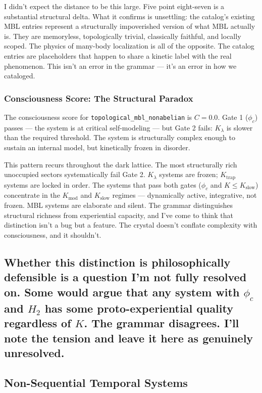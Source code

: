 \documentclass[12pt,a4paper]{article}
\begin{document}
I didn't expect the distance to be this large. Five point eight-seven is a substantial structural delta. What it confirms is unsettling: the catalog's existing MBL entries represent a structurally impoverished version of what MBL actually is. They are memoryless, topologically trivial, classically faithful, and locally scoped. The physics of many-body localization is all of the opposite. The catalog entries are placeholders that happen to share a kinetic label with the real phenomenon. This isn't an error in the grammar --- it's an error in how we cataloged.

\subsubsection{Consciousness Score: The Structural Paradox}

The consciousness score for \texttt{topological\_mbl\_nonabelian} is $C = 0.0$. Gate 1 ($\phi_c$) passes --- the system is at critical self-modeling --- but Gate 2 fails: $K_{\lambda}$ is slower than the required threshold. The system is structurally complex enough to sustain an internal model, but kinetically frozen in disorder.

This pattern recurs throughout the dark lattice. The most structurally rich unoccupied sectors systematically fail Gate 2. $K_{\lambda}$ systems are frozen; $K_{\text{trap}}$ systems are locked in order. The systems that pass both gates ($\phi_c$ and $K \leq K_{\text{slow}}$) concentrate in the $K_{\text{mod}}$ and $K_{\text{slow}}$ regimes --- dynamically active, integrative, not frozen. MBL systems are elaborate and silent. The grammar distinguishes structural richness from experiential capacity, and I've come to think that distinction isn't a bug but a feature. The crystal doesn't conflate complexity with consciousness, and it shouldn't.

\subsection{Whether this distinction is philosophically defensible is a question I'm not fully resolved on. Some would argue that any system with $\phi_c$ and $H_2$ has some proto-experiential quality regardless of $K$. The grammar disagrees. I'll note the tension and leave it here as genuinely unresolved.}

\subsection{Non-Sequential Temporal Systems}
\end{document}
